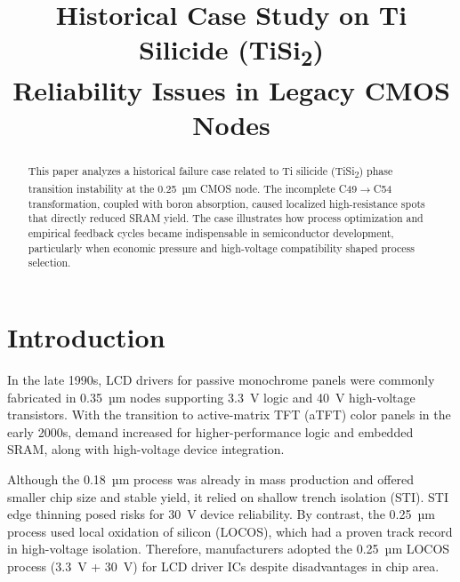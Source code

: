 \documentclass[conference]{IEEEtran}
\begin{document}
\title{Historical Case Study on Ti Silicide (TiSi\textsubscript{2}) \\ Reliability Issues in Legacy CMOS Nodes}

\author{
}

\maketitle

\begin{abstract}
This paper analyzes a historical failure case related to Ti silicide (TiSi\textsubscript{2}) phase transition instability at the 0.25~µm CMOS node. 
The incomplete C49$\rightarrow$C54 transformation, coupled with boron absorption, caused localized high-resistance spots that directly reduced SRAM yield. 
The case illustrates how process optimization and empirical feedback cycles became indispensable in semiconductor development, particularly when economic pressure and high-voltage compatibility shaped process selection.
\end{abstract}

\section{Introduction}
In the late 1990s, LCD drivers for passive monochrome panels were commonly fabricated in 0.35~µm nodes supporting 3.3~V logic and 40~V high-voltage transistors.  
With the transition to active-matrix TFT (aTFT) color panels in the early 2000s, demand increased for higher-performance logic and embedded SRAM, along with high-voltage device integration.  

Although the 0.18~µm process was already in mass production and offered smaller chip size and stable yield, it relied on shallow trench isolation (STI). STI edge thinning posed risks for 30~V device reliability.  
By contrast, the 0.25~µm process used local oxidation of silicon (LOCOS), which had a proven track record in high-voltage isolation.  
Therefore, manufacturers adopted the 0.25~µm LOCOS process (3.3~V + 30~V) for LCD driver ICs despite disadvantages in chip area.
\end{document}
